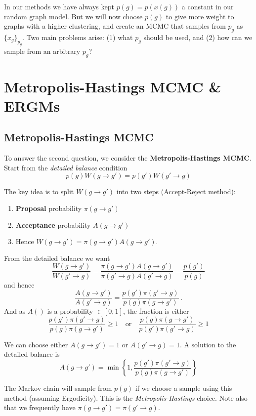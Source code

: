 \documentclass[12pt]{article}
\theoremstyle{definition}
\begin{document}
In our methods we have always kept $p(g) = p(x(g))$ a constant in our random graph model. But we will now choose $p(g)$ to give more weight to graphs with a higher clustering, and create an MCMC that samples from $p_g$ as $\{x_g\}_{p_g}$. Two main problems arise: (1) what $p_g$ should be used, and (2) how can we sample from an arbitrary $p_g$?

\section{Metropolis-Hastings MCMC \& ERGMs}

\subsection{Metropolis-Hastings MCMC}

To answer the second question, we consider the \textbf{Metropolis-Hastings MCMC}. Start from the \textit{detailed balance} condition
\[ p(g)W(g\to g') = p(g') W(g'\to g)\]

The key idea is to split $W(g\to g')$ into two steps (Accept-Reject method): 
\begin{enumerate}
    \item \textbf{Proposal} probability $\pi(g\to g')$ 
    \item \textbf{Acceptance} probability $A(g\to g')$
    \item Hence $W(g\to g') = \pi(g\to g')A(g\to g')$. 
\end{enumerate}
From the detailed balance we want 
\[ \frac{W(g\to g')}{W(g'\to g)} = \frac{\pi(g\to g')A(g\to g')}{\pi(g'\to g)A(g'\to g)} = \frac{p(g')}{p(g)} \]
and hence
\[ \frac{A(g\to g')}{A(g'\to g)} = \frac{p(g')\pi(g'\to g)}{p(g)\pi(g\to g')} \,.\]
And as $A()$ is a probability $\in[0,1]$, the fraction is either
\[ \frac{p(g')\pi(g'\to g)}{p(g)\pi(g\to g')}\geq 1 \quad\text{or}\quad \frac{p(g)\pi(g\to g')}{p(g')\pi(g'\to g)} \geq 1\]

We can choose either $A(g\to g')=1$ or $A(g'\to g)=1$. A solution to the detailed balance is 
\begin{equation}\label{metroAlgo1}
A(g\to g') = \min \left\{ 1, \frac{p(g')\pi(g' \to g)}{p(g)\pi(g\to g')}\right\} 
\end{equation}

The Markov chain will sample from $p(g)$ if we choose a sample using this method (assuming Ergodicity). This is the \textit{Metropolis-Hastings} choice. Note also that we frequently have $\pi(g\to g') = \pi(g'\to g)$. 
\end{document}
